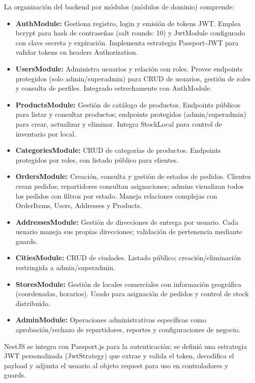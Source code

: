   La organización del backend por módulos (módulos de dominio) comprende:
  \begin{itemize}
    \item \textbf{AuthModule:} Gestiona registro, login y emisión de tokens JWT. Emplea bcrypt para hash de contraseñas (salt rounds: 10) y JwtModule configurado con clave secreta y expiración. Implementa estrategia Passport-JWT para validar tokens en headers Authorization.
    \item \textbf{UsersModule:} Administra usuarios y relación con roles. Provee endpoints protegidos (solo admin/superadmin) para CRUD de usuarios, gestión de roles y consulta de perfiles. Integrado estrechamente con AuthModule.
    \item \textbf{ProductsModule:} Gestión de catálogo de productos. Endpoints públicos para listar y consultar productos; endpoints protegidos (admin/superadmin) para crear, actualizar y eliminar. Integra StockLocal para control de inventario por local.
    \item \textbf{CategoriesModule:} CRUD de categorías de productos. Endpoints protegidos por roles, con listado público para clientes.
    \item \textbf{OrdersModule:} Creación, consulta y gestión de estados de pedidos. Clientes crean pedidos; repartidores consultan asignaciones; admins visualizan todos los pedidos con filtros por estado. Maneja relaciones complejas con OrderItems, Users, Addresses y Products.
    \item \textbf{AddressesModule:} Gestión de direcciones de entrega por usuario. Cada usuario maneja sus propias direcciones; validación de pertenencia mediante guards.
    \item \textbf{CitiesModule:} CRUD de ciudades. Listado público; creación/eliminación restringida a admin/superadmin.
    \item \textbf{StoresModule:} Gestión de locales comerciales con información geográfica (coordenadas, horarios). Usado para asignación de pedidos y control de stock distribuido.
    \item \textbf{AdminModule:} Operaciones administrativas específicas como aprobación/rechazo de repartidores, reportes y configuraciones de negocio.
  \end{itemize}

  NestJS se integra con Passport.js para la autenticación; se definió una estrategia JWT personalizada (JwtStrategy) que extrae y valida el token, decodifica el payload y adjunta el usuario al objeto request para uso en controladores y guards.

